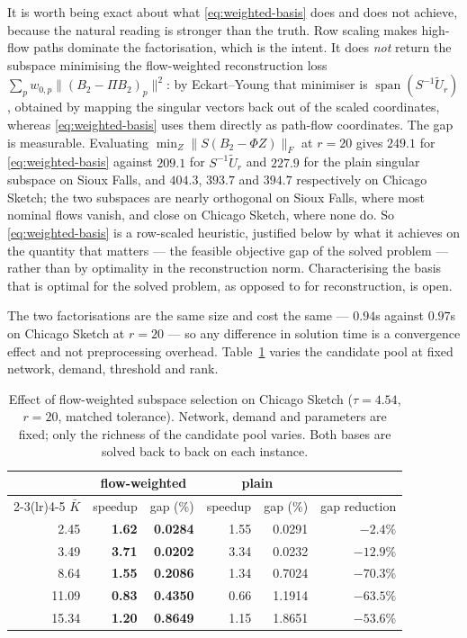 \documentclass[11pt]{article}
\begin{document}
It is worth being exact about what \eqref{eq:weighted-basis} does and does not achieve, because
the natural reading is stronger than the truth. Row scaling makes high-flow paths dominate the
factorisation, which is the intent. It does \emph{not} return the subspace minimising the
flow-weighted reconstruction loss $\sum_p w_{0,p}\|(B_2-\Pi B_2)_p\|^2$: by Eckart--Young that
minimiser is $\operatorname{span}(S^{-1}\widetilde U_r)$, obtained by mapping the singular
vectors back out of the scaled coordinates, whereas \eqref{eq:weighted-basis} uses them
directly as path-flow coordinates. The gap is measurable. Evaluating
$\min_Z\|S(B_2-\Phi Z)\|_F$ at $r=20$ gives $249.1$ for \eqref{eq:weighted-basis} against
$209.1$ for $S^{-1}\widetilde U_r$ and $227.9$ for the plain singular subspace on Sioux Falls,
and $404.3$, $393.7$ and $394.7$ respectively on Chicago Sketch; the two subspaces are nearly
orthogonal on Sioux Falls, where most nominal flows vanish, and close on Chicago Sketch, where
none do. So \eqref{eq:weighted-basis} is a row-scaled heuristic, justified below by what it
achieves on the quantity that matters --- the feasible objective gap of the solved problem ---
rather than by optimality in the reconstruction norm. Characterising the basis that is optimal
for the solved problem, as opposed to for reconstruction, is open.

The two factorisations are the same size and cost the same --- $0.94$s against $0.97$s on
Chicago Sketch at $r=20$ --- so any difference in solution time is a convergence effect and not
preprocessing overhead. Table~\ref{tab:weighted-basis} varies the candidate pool at fixed
network, demand, threshold and rank.

\begin{table}[h]
\centering
\caption{Effect of flow-weighted subspace selection on Chicago Sketch ($\tau=4.54$, $r=20$,
matched tolerance). Network, demand and parameters are fixed; only the richness of the
candidate pool varies. Both bases are solved back to back on each instance.}
\label{tab:weighted-basis}
{\small
\begin{tabular}{rrrrrr}
\toprule
& \multicolumn{2}{c}{flow-weighted} & \multicolumn{2}{c}{plain} & \\
\cmidrule(lr){2-3}\cmidrule(lr){4-5}
$\bar K$ & speedup & gap (\%) & speedup & gap (\%) & gap reduction\\
\midrule
2.45  & \textbf{1.62} & \textbf{0.0284} & 1.55 & 0.0291 & $-2.4\%$\\
3.49  & \textbf{3.71} & \textbf{0.0202} & 3.34 & 0.0232 & $-12.9\%$\\
8.64  & \textbf{1.55} & \textbf{0.2086} & 1.34 & 0.7024 & $\mathbf{-70.3\%}$\\
11.09 & \textbf{0.83} & \textbf{0.4350} & 0.66 & 1.1914 & $\mathbf{-63.5\%}$\\
15.34 & \textbf{1.20} & \textbf{0.8649} & 1.15 & 1.8651 & $\mathbf{-53.6\%}$\\
\bottomrule
\end{tabular}}
\end{table}
\end{document}
